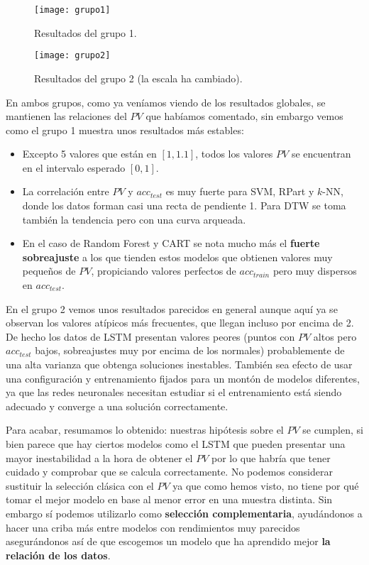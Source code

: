 \begin{figure}[htbp]
  \centering
  \hspace*{-1.5cm}
  \texttt{[image: grupo1]}
  \caption{Resultados del grupo 1.}
  \label{fig:pv-grupo1}
\end{figure}

\begin{figure}[htbp]
  \centering
  \texttt{[image: grupo2]}
  \caption{Resultados del grupo 2 (la escala ha cambiado).}
  \label{fig:pv-grupo2}
\end{figure}

En ambos grupos, como ya veníamos viendo de los resultados globales, se mantienen las relaciones del $PV$ que habíamos comentado, sin embargo vemos como el grupo 1 muestra unos resultados más estables:

\begin{itemize}
  \item Excepto 5 valores que están en $[1, 1.1]$, todos los valores $PV$ se encuentran en el intervalo esperado $[0,1]$.
  \item La correlación entre $PV$ y $acc_{test}$ es muy fuerte para SVM, RPart y $k$-NN, donde los datos forman casi una recta de pendiente 1. Para DTW se toma también la tendencia pero con una curva arqueada.
  \item En el caso de Random Forest y CART se nota mucho más el \textbf{fuerte sobreajuste} a los que tienden estos modelos que obtienen valores muy pequeños de $PV$, propiciando valores perfectos de $acc_{train}$ pero muy dispersos en $acc_{test}$.
\end{itemize}

En el grupo 2 vemos unos resultados parecidos en general aunque aquí ya se observan los valores atípicos más frecuentes, que llegan incluso por encima de 2. De hecho los datos de LSTM presentan valores peores (puntos con $PV$ altos pero $acc_{test}$ bajos, sobreajustes muy por encima de los normales) probablemente de una alta varianza que obtenga soluciones inestables. También sea efecto de usar una configuración y entrenamiento fijados para un montón de modelos diferentes, ya que las redes neuronales necesitan estudiar si el entrenamiento está siendo adecuado y converge a una solución correctamente.

Para acabar, resumamos lo obtenido: nuestras hipótesis sobre el $PV$ se cumplen, si bien parece que hay ciertos modelos como el LSTM que pueden presentar una mayor inestabilidad a la hora de obtener el $PV$ por lo que habría que tener cuidado y comprobar que se calcula correctamente. No podemos considerar sustituir la selección clásica con el $PV$ ya que como hemos visto, no tiene por qué tomar el mejor modelo en base al menor error en una muestra distinta. Sin embargo sí podemos utilizarlo como \textbf{selección complementaria}, ayudándonos a hacer una criba más entre modelos con rendimientos muy parecidos asegurándonos así de que escogemos un modelo que ha aprendido mejor \textbf{la relación de los datos}.

